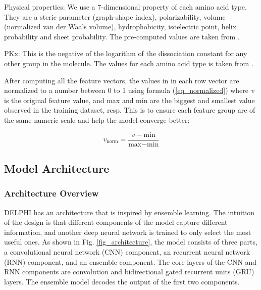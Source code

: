 Physical properties: We use a 7-dimensional property of each amino acid type. They are a steric parameter (graph-shape index), polarizability, volume (normalized van der Waals volume), hydrophobicity, isoelectric point, helix probability and sheet probability. The pre-computed values are taken from \cite{zhang2019sequence}.

PKx: This is the negative of the logarithm of the dissociation constant for any other group in the molecule. The values for each amino acid type is taken from \cite{zhang2019sequence}.

After computing all the feature vectors, the values in in each row vector are normalized to a number between 0 to 1 using formula (\ref{eq_normalized}) where \textit{v} is the original feature value, and max and min are the biggest and smallest value observed in the training dataset, resp. This is to ensure each feature group are of the same numeric scale and help the model converge better:

\begin{equation}
v_\text{norm}=\dfrac{v-\text{min}}{\text{max}-\text{min}}\label{eq_normalized}
\end{equation}

\subsection{Model Architecture}
\subsubsection{Architecture Overview}
DELPHI has an architecture that is inspired by ensemble learning. The intuition of the design is that different components of the model capture different information, and another deep neural network is trained to only select the most useful ones. As shown in Fig. \ref{fig_architecture}, the model consists of three parts, a convolutional neural network (CNN) component, an recurrent neural network (RNN) component, and an ensemble component. The core layers of the CNN and RNN components are convolution and bidirectional gated recurrent units (GRU) layers. The ensemble model decodes the output of the first two components.  

